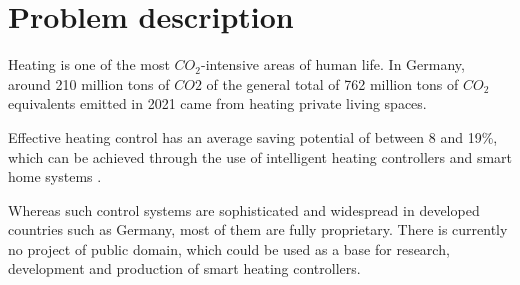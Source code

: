 %
%

\chapter{Problem description}
\label{chap:Introduction}
%
Heating is one of the most $CO_2$-intensive areas of human life. In Germany, around 210 million tons of $CO2$ of the general total of 762 million tons of $CO_2$ equivalents emitted in 2021 came from heating private living spaces. \cite{StatistischesBundesamt.16.07.2025} \cite{Umweltbundesamt.13.10.2025}

Effective heating control has an average saving potential of between 8 and 19\%, which can be achieved through the use of intelligent heating controllers and smart home systems \cite{Kersken.2018}. 

Whereas such control systems are sophisticated and widespread in developed countries such as Germany, most of them are fully proprietary. There is currently no project of public domain, which could be used as a base for research, development and production of smart heating controllers.